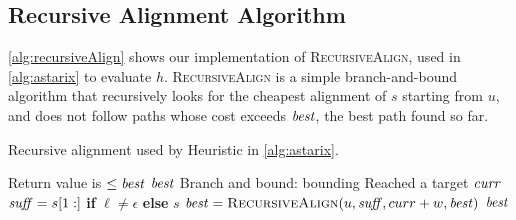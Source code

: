 \subsection{Recursive Alignment Algorithm} \label{app:recursive-align}
\cref{alg:recursiveAlign} shows our implementation of \textsc{RecursiveAlign},
used in \cref{alg:astarix} to evaluate $h$. \textsc{RecursiveAlign} is a simple
branch-and-bound algorithm that recursively looks for the cheapest alignment of
$s$ starting from $u$, and does not follow paths whose cost exceeds
$\mathit{best}$, the best path found so far.

\begin{algorithm}[t]
	\caption{Recursive alignment used by Heuristic in \cref{alg:astarix}.}\label{alg:recursiveAlign}
	\begin{algorithmic}[1]
		\Statex
			 \Comment
			Return value is $\leq \mathit{best}$
				\State \Return $\mathit{best}$
				\Comment Branch and bound: bounding
			\EndIf
				\Comment Reached a target
				\State \Return $\mathit{curr}$
			\EndIf
				\State $\mathit{suff} = s[1:]$ \textbf{if} $\ell \neq \epsilon$ \textbf{else} $s$
				\State $\mli{best} = \Call{RecursiveAlign}{u, \mli{suff}, curr + w, \mli{best}}$
			\EndFor
			\State \Return $\mathit{best}$
		\EndFunction
	\end{algorithmic}
\end{algorithm}
